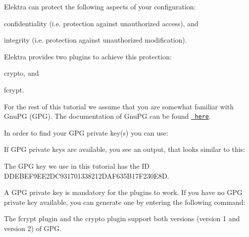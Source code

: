 Elektra can protect the following aspects of your configuration\+:


\begin{DoxyEnumerate}
\item confidentiality (i.\+e. protection against unauthorized access), and
\item integrity (i.\+e. protection against unauthorized modification).
\end{DoxyEnumerate}

Elektra provides two plugins to achieve this protection\+:


\begin{DoxyEnumerate}
\item {\ttfamily crypto}, and
\item {\ttfamily fcrypt}.
\end{DoxyEnumerate}

For the rest of this tutorial we assume that you are somewhat familiar with Gnu\+PG (G\+PG). The documentation of Gnu\+PG can be found \href{https://gnupg.org/documentation/index.html}{\texttt{ here}}.

In order to find your G\+PG private key(s) you can use\+:


\begin{DoxyCode}{0}
\end{DoxyCode}


If G\+PG private keys are available, you see an output, that looks similar to this\+:


\begin{DoxyCode}{0}
\end{DoxyCode}


The G\+PG key we use in this tutorial has the ID {\ttfamily D\+D\+E\+B\+E\+F9\+E\+E2\+D\+C931701338212\+D\+A\+F635\+B17\+F230\+E8D}.

A G\+PG private key is mandatory for the plugins to work. If you have no G\+PG private key available, you can generate one by entering the following command\+:


\begin{DoxyCode}{0}
\end{DoxyCode}


The {\ttfamily fcrypt} plugin and the {\ttfamily crypto} plugin support both versions (version 1 and version 2) of G\+PG.

